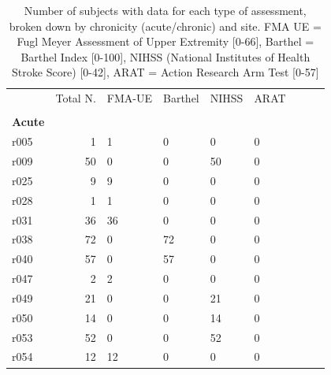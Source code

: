 \documentclass[10pt]{article}
\begin{document}
\begin{table}[h]
\centering
\caption{Number of subjects with data for each type of assessment, broken down by chronicity (acute/chronic) and site. FMA UE = Fugl Meyer Assessment of Upper Extremity [0-66], Barthel = Barthel Index [0-100], NIHSS (National Institutes of Health Stroke Score) [0-42], ARAT = Action Research Arm Test [0-57]}
\label{motor_scores}
\begin{tabular}{lrlllllll}
\toprule
 & Total N. & FMA-UE  & Barthel & NIHSS  & ARAT \\
 & & &  &  \\
 \textbf{Acute}  & & & & & \\
\arrayrulecolor{black!30}\midrule
r005 & 1 & 1 & 0 & 0 & 0 \\
r009 & 50 & 0 & 0 & 50 & 0 \\
r025 & 9 & 9 & 0 & 0 & 0 \\
r028 & 1 & 1 & 0 & 0 & 0 \\
r031 & 36 & 36 & 0 & 0 & 0 \\
r038 & 72 & 0 & 72 & 0 & 0 \\
r040 & 57 & 0 & 57 & 0 & 0 \\
r047 & 2 & 2 & 0 & 0 & 0 \\
r049 & 21 & 0 & 0 & 21 & 0 \\
r050 & 14 & 0 & 0 & 14 & 0 \\
r053 & 52 & 0 & 0 & 52 & 0 \\
r054 & 12 & 12 & 0 & 0 & 0 \\


\end{tabular}
\end{table}
\end{document}
